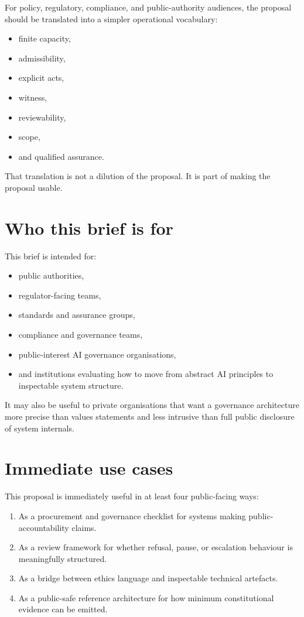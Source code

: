 \documentclass[11pt]{article}
\begin{document}
For policy, regulatory, compliance, and public-authority audiences, the proposal should be translated into a simpler operational vocabulary:
\begin{itemize}[leftmargin=2em]
    \item finite capacity,
    \item admissibility,
    \item explicit acts,
    \item witness,
    \item reviewability,
    \item scope,
    \item and qualified assurance.
\end{itemize}

That translation is not a dilution of the proposal. It is part of making the proposal usable.

\section{Who this brief is for}

This brief is intended for:
\begin{itemize}[leftmargin=2em]
    \item public authorities,
    \item regulator-facing teams,
    \item standards and assurance groups,
    \item compliance and governance teams,
    \item public-interest AI governance organisations,
    \item and institutions evaluating how to move from abstract AI principles to inspectable system structure.
\end{itemize}

It may also be useful to private organisations that want a governance architecture more precise than values statements and less intrusive than full public disclosure of system internals.

\section{Immediate use cases}

This proposal is immediately useful in at least four public-facing ways:

\begin{enumerate}[leftmargin=2em,label=\arabic*.]
    \item As a procurement and governance checklist for systems making public-accountability claims.
    \item As a review framework for whether refusal, pause, or escalation behaviour is meaningfully structured.
    \item As a bridge between ethics language and inspectable technical artefacts.
    \item As a public-safe reference architecture for how minimum constitutional evidence can be emitted.
\end{enumerate}
\end{document}
